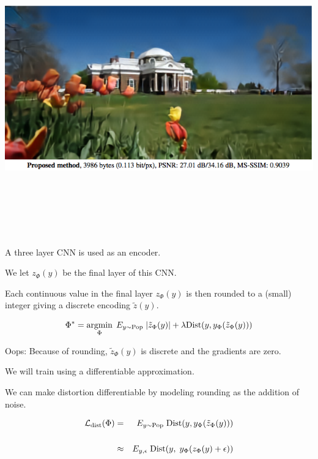 {

\bigskip
\centerline{\includegraphics[height = 5in]{../images/RateDist4}}


A three layer CNN is used as an encoder.

\vfill
We let $z_\Phi(y)$ be the final layer of this CNN.

\vfill
Each continuous value in the final layer $z_\Phi(y)$ is then rounded to a (small) integer giving a discrete encoding $\tilde{z}(y)$.


$$\Phi^* = \operatorname*{argmin}_\Phi \;E_{y \sim \mathrm{Pop}}\;|\tilde{z}_\Phi(y)| + \lambda \mathrm{Dist}(y,y_\Phi(\tilde{z}_\Phi(y)))$$

\vfill
Oops: Because of rounding, $\tilde{z}_\Phi(y)$ is discrete and the gradients are zero.

\vfill
We will train using a differentiable approximation.


We can make distortion differentiable by modeling rounding as the addition of noise.

\begin{eqnarray*}
{\cal L}_{\mathrm{dist}}(\Phi) & = & E_{y \sim \mathrm{Pop}} \;\mathrm{Dist}(y,y_\Phi(\tilde{z}_\Phi(y))) \\
\\
& \approx & E_{y,\epsilon} \;\mathrm{Dist}(y,\;y_\Phi(z_\Phi(y) + \epsilon))
\end{eqnarray*}

}

